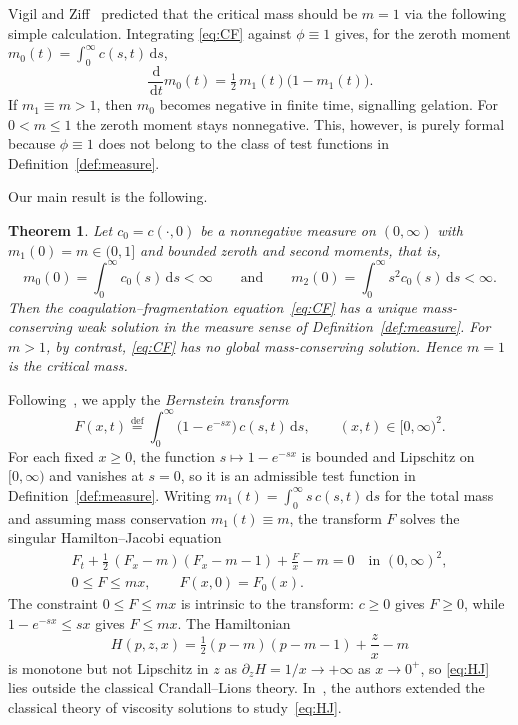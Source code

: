\documentclass[12pt]{amsart}
\numberwithin{equation}{section}
\theoremstyle{plain}
\newtheorem{theorem}{Theorem}[section]
\theoremstyle{definition}
\newcommand{\dd}{\,\mathrm{d}}
\renewcommand{\d}{\partial}
\begin{document}
Vigil and Ziff~\cite{VigilZiff} predicted that the critical mass
should be $m=1$
via the following simple calculation.
Integrating \eqref{eq:CF}
against $\phi\equiv 1$ gives, for the zeroth moment $m_0(t)=\int_0^\infty
	c(s,t)\dd s$,
\begin{equation}\label{eq:zeroth}
	\frac{\dd}{\dd t}m_0(t)=\tfrac12\,m_1(t)\bigl(1-m_1(t)\bigr).
\end{equation}
If $m_1\equiv m>1$, then $m_0$ becomes negative in finite time, signalling
gelation. For $0<m\le1$ the zeroth moment stays nonnegative.
This, however, is purely formal because $\phi \equiv 1$ does not belong to the class of test
functions in Definition~\ref{def:measure}.




Our main result is the following.

\begin{theorem}\label{thm:main}
	Let $c_0=c(\cdot,0)$ be a nonnegative measure on $(0,\infty)$ with
	$m_1(0)=m\in(0,1]$ and bounded zeroth and second moments, that is,
	\[
		m_0(0)=\int_0^\infty c_0(s)\dd s<\infty
		\qquad\text{and}\qquad
		m_2(0)=\int_0^\infty s^2c_0(s)\dd s<\infty .
	\]
	Then the coagulation--fragmentation equation~\eqref{eq:CF} has a unique
	mass-conserving weak solution in the measure sense of
	Definition~\ref{def:measure}.
	For $m>1$, by contrast,
	\eqref{eq:CF} has no global mass-conserving solution.
	Hence $m=1$ is the
	critical mass.
\end{theorem}

Following~\cite{TV}, we apply the \emph{Bernstein transform}
\begin{equation}\label{eq:Bernstein}
	F(x,t)\stackrel{\text{def}}{=}\int_0^\infty\bigl(1-e^{-sx}\bigr)\,c(s,t)\dd s,
	\qquad (x,t)\in[0,\infty)^2 .
\end{equation}
For each fixed $x\ge0$, the function $s\mapsto1-e^{-sx}$ is bounded and
Lipschitz on $[0,\infty)$ and vanishes at $s=0$, so it is an admissible test
function in Definition~\ref{def:measure}.
Writing $m_1(t)=\int_0^\infty s\,c(s,t)\dd s$ for the total mass and assuming
mass conservation $m_1(t)\equiv m$, the transform $F$ solves the singular
Hamilton--Jacobi equation
\begin{equation}\label{eq:HJ}
	\begin{gathered}
		F_t+\tfrac12\,(F_x-m)(F_x-m-1)+\frac{F}{x}-m=0
		\quad\text{in }(0,\infty)^2,\\
		0\le F\le mx ,\qquad F(x,0)=F_0(x).
	\end{gathered}
\end{equation}
The constraint $0\le F\le mx$ is intrinsic to the transform: $c\ge0$ gives
$F\ge0$, while $1-e^{-sx}\le sx$ gives $F\le mx$.
The Hamiltonian
\begin{equation*}
	H(p,z,x)=\tfrac12(p-m)(p-m-1)+\frac{z}{x} -m
\end{equation*}
is monotone but not Lipschitz in $z$ as
$\d_z H=1/x\to+\infty$ as $x\to0^+$, so \eqref{eq:HJ} lies outside the classical
Crandall--Lions theory.
In~\cite{TV}, the authors extended the classical theory of viscosity
solutions to study~\eqref{eq:HJ}.
\end{document}
